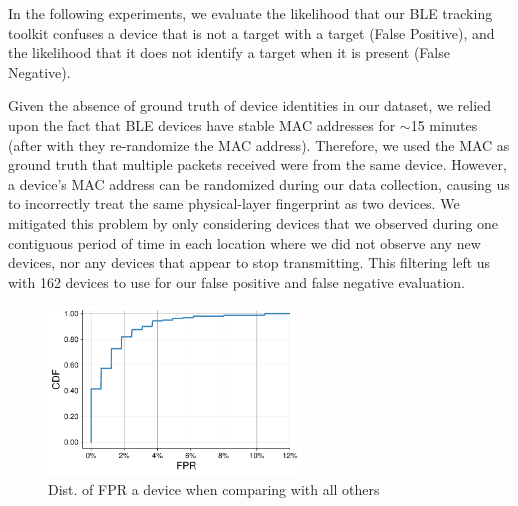 

In the following experiments, we evaluate %
the likelihood that our BLE tracking toolkit confuses a 
device that is not a target with a target (False Positive), and the likelihood
that it does not identify a target when it is present (False Negative).

Given the absence of ground truth of device identities in our dataset, we
relied upon the fact that BLE devices have stable MAC addresses for $\sim$15
minutes (after with they re-randomize the MAC address). Therefore, we used the
MAC as ground truth that multiple packets received were from the same device.
%
However, a device's MAC address can be randomized 
during our data collection, causing us to incorrectly treat the same
physical-layer fingerprint as two devices. We mitigated this problem by only considering devices that we 
observed during one contiguous period of time in each location where we did not
observe any new devices, nor any devices that appear to stop transmitting.
This filtering left us with 162 devices to use for our false positive and false negative evaluation.


\begin{figure}[!h]
    \centering
    \includegraphics[width = 0.6\textwidth]{bletracking/plots/fpr_cdf2.pdf} 
    \caption{Dist. of FPR a device when comparing with all others}
    \label{fig:fpr_cdf}
\end{figure}




